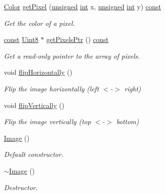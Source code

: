 \begin{DoxyCompactItemize}
\hyperlink{classsf_1_1_color}{Color} \hyperlink{classsf_1_1_image_a8c8460e311dcb00557cb00a81c29163d}{get\-Pixel} (\hyperlink{curses_8priv_8h_aca40206900cfc164654362fa8d4ad1e6}{unsigned} \hyperlink{term__entry_8h_ad65b480f8c8270356b45a9890f6499ae}{int} x, \hyperlink{curses_8priv_8h_aca40206900cfc164654362fa8d4ad1e6}{unsigned} \hyperlink{term__entry_8h_ad65b480f8c8270356b45a9890f6499ae}{int} y) \hyperlink{term__entry_8h_a57bd63ce7f9a353488880e3de6692d5a}{const} 
\begin{DoxyCompactList}\small\item\em Get the color of a pixel. \end{DoxyCompactList}\item 
\hyperlink{term__entry_8h_a57bd63ce7f9a353488880e3de6692d5a}{const} \hyperlink{namespacesf_a4ef3d630785c4f296f9b4f274c33d78e}{Uint8} $\ast$ \hyperlink{classsf_1_1_image_ac6137a608a9efaae2735c13ff259c214}{get\-Pixels\-Ptr} () \hyperlink{term__entry_8h_a57bd63ce7f9a353488880e3de6692d5a}{const} 
\begin{DoxyCompactList}\small\item\em Get a read-\/only pointer to the array of pixels. \end{DoxyCompactList}\item 
void \hyperlink{classsf_1_1_image_a57168e7bc29190e08bbd6c9c19f4bb2c}{flip\-Horizontally} ()
\begin{DoxyCompactList}\small\item\em Flip the image horizontally (left $<$-\/$>$ right) \end{DoxyCompactList}\item 
void \hyperlink{classsf_1_1_image_a78a702a7e49d1de2dec9894da99d279c}{flip\-Vertically} ()
\begin{DoxyCompactList}\small\item\em Flip the image vertically (top $<$-\/$>$ bottom) \end{DoxyCompactList}\item 
\hyperlink{classsf_1_1_image_abb4caf3cb167b613345ebe36fc883f12}{Image} ()
\begin{DoxyCompactList}\small\item\em Default constructor. \end{DoxyCompactList}\item 
\hyperlink{classsf_1_1_image_a0ba22a38e6c96e3b37dd88198046de83}{$\sim$\-Image} ()
\begin{DoxyCompactList}\small\item\em Destructor. \end{DoxyCompactList}\item 

\end{DoxyCompactItemize}
